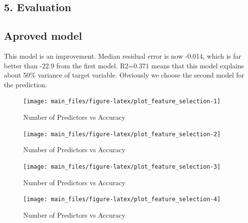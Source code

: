 \hypertarget{evaluation}{%
\subsection{5. Evaluation}\label{evaluation}}

\hypertarget{aproved-model}{%
\subsection{Aproved model}\label{aproved-model}}

This model is an improvement. Median residual error is now -0.014, which
is far better than -22.9 from the first model. R2=0.371 means that this
model explains about 50\% variance of target variable. Obviously we
choose the second model for the prediction.

\begin{Schunk}
\begin{figure}[H]

{\centering \texttt{[image: main\_files/figure-latex/plot\_feature\_selection-1]} 

}

\caption[Number of Predictors vs Accuracy]{Number of Predictors vs Accuracy}\label{fig:plot_feature_selection1}
\end{figure}
\begin{figure}[H]

{\centering \texttt{[image: main\_files/figure-latex/plot\_feature\_selection-2]} 

}

\caption[Number of Predictors vs Accuracy]{Number of Predictors vs Accuracy}\label{fig:plot_feature_selection2}
\end{figure}
\begin{figure}[H]

{\centering \texttt{[image: main\_files/figure-latex/plot\_feature\_selection-3]} 

}

\caption[Number of Predictors vs Accuracy]{Number of Predictors vs Accuracy}\label{fig:plot_feature_selection3}
\end{figure}
\begin{figure}[H]

{\centering \texttt{[image: main\_files/figure-latex/plot\_feature\_selection-4]} 

}

\caption[Number of Predictors vs Accuracy]{Number of Predictors vs Accuracy}\label{fig:plot_feature_selection4}
\end{figure}
\end{Schunk}

